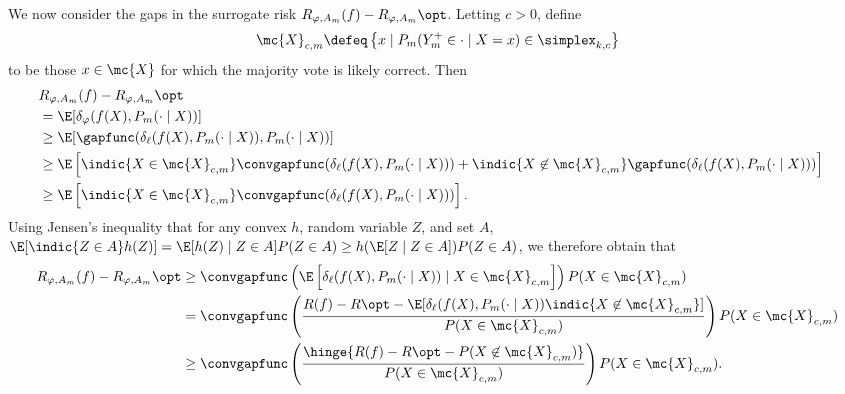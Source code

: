\documentclass[11pt]{article}
\newcommand{\tloss}{\ell}  %
\newcommand{\sloss}{\varphi}  %
\newcommand{\extloss}{\delta_\tloss}
\newcommand{\exsloss}{\delta_\sloss}
\begin{document}
We now consider the gaps in the surrogate risk $R_{\sloss,A_m}(f) -
R_{\sloss,A_m}\opt$.
%
Letting $c > 0$, define
\begin{equation*}
  \mc{X}_{c,m} \defeq \left\{x \mid
  P_m(Y^+_m \in \cdot \mid X = x) \in \simplex_{k,c}\right\}
\end{equation*}
to be those $x \in \mc{X}$ for which the majority vote is likely correct.
%
Then
\begin{align*}
  \lefteqn{R_{\sloss, A_m}(f) - R_{\sloss, A_m}\opt} \\
  & = \E[\exsloss(f(X), P_m(\cdot \mid X))] \\
  & \ge \E[\gapfunc(\extloss(f(X), P_m(\cdot \mid X)), P_m(\cdot \mid X))] \\
  & \ge \E\left[\indic{X \in \mc{X}_{c,m}}
    \convgapfunc(\extloss(f(X), P_m(\cdot \mid X)))
    + \indic{X \not\in \mc{X}_{c,m}}
    \gapfunc(\extloss(f(X), P_m(\cdot \mid X)))\right] \\
  & \ge \E\left[\indic{X \in \mc{X}_{c,m}}
    \convgapfunc(\extloss(f(X), P_m(\cdot \mid X)))\right].
\end{align*}
Using Jensen's inequality that for any convex $h$, random variable
$Z$, and set $A$,
$\E[\indic{Z \in A} h(Z)]
= \E[h(Z) \mid Z \in A] P(Z \in A)
\ge h(\E[Z \mid Z \in A]) P(Z \in A)$,
we therefore obtain that
\begin{align}
  \nonumber
  R_{\sloss, A_m}(f) - R_{\sloss, A_m}\opt
  & \ge \convgapfunc\left(
  \E\left[\extloss(f(X), P_m(\cdot \mid X)) \mid X \in \mc{X}_{c,m}\right]
  \right) P(X \in \mc{X}_{c,m}) \\
  & = \convgapfunc\left(
  \frac{R(f) - R\opt - \E[\extloss(f(X), P_m(\cdot \mid X))
      \indic{X \not\in \mc{X}_{c,m}}]}{
    P(X \in \mc{X}_{c,m})}\right)
  P(X \in \mc{X}_{c,m}) \nonumber \\
  & \ge
  \convgapfunc\left(
  \frac{\hinge{R(f) - R\opt - P(X \not\in \mc{X}_{c,m})}}{
    P(X \in \mc{X}_{c,m})}\right)
  P(X \in \mc{X}_{c,m}).
  \label{eqn:majority-risk-gap}
\end{align}
\end{document}
